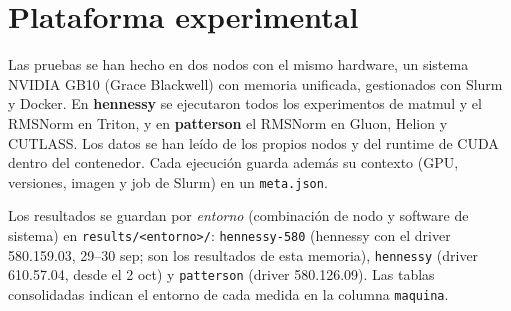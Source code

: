 
\section{Plataforma experimental}
\label{sec:plataforma}

Las pruebas se han hecho en dos nodos con el mismo hardware, un sistema NVIDIA GB10 (Grace
Blackwell) con memoria unificada, gestionados con Slurm y Docker. En \textbf{hennessy} se
ejecutaron todos los experimentos de matmul y el RMSNorm en Triton, y en \textbf{patterson}
el RMSNorm en Gluon, Helion y CUTLASS. Los datos se han leído de los propios nodos y del
runtime de CUDA dentro del contenedor. Cada ejecución guarda además su contexto (GPU,
versiones, imagen y job de Slurm) en un \texttt{meta.json}.

Los resultados se guardan por \emph{entorno} (combinación de nodo y software de sistema)
en \texttt{results/<entorno>/}: \texttt{hennessy-580} (hennessy con el driver 580.159.03,
29--30 sep; son los resultados de esta memoria), \texttt{hennessy} (driver 610.57.04, desde el
2 oct) y \texttt{patterson} (driver 580.126.09). Las tablas consolidadas indican el entorno de
cada medida en la columna \texttt{maquina}.

